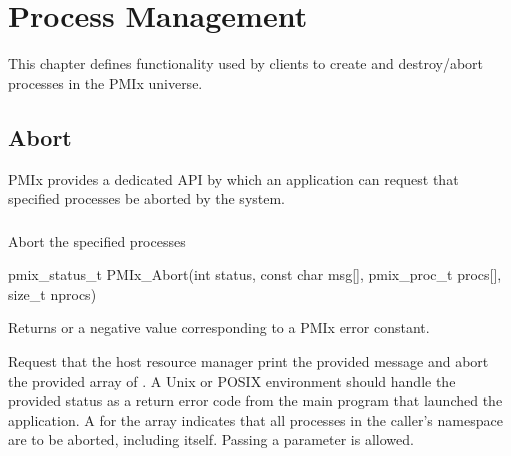 \chapter{Process Management}
\label{chap:api_proc_mgmt}

This chapter defines functionality used by clients to create and destroy/abort processes in the \ac{PMIx} universe.

\section{Abort}
\label{chap:api_proc_mgmt:abort}

\ac{PMIx} provides a dedicated API by which an application can request that specified processes be aborted by the system.

\subsection{}

\summary

Abort the specified processes

\format

\cspecificstart
\begin{codepar}
pmix_status_t
PMIx_Abort(int status, const char msg[],
           pmix_proc_t procs[], size_t nprocs)
\end{codepar}
\cspecificend

\begin{arglist}
\end{arglist}

Returns  or a negative value corresponding to a PMIx error constant.

\descr

Request that the host resource manager print the provided message and abort the provided array of .
A Unix or POSIX environment should handle the provided status as a return error code from the main program that launched the application.
A  for the  array indicates that all processes in the caller's namespace are to be aborted, including itself.
Passing a   parameter is allowed.

